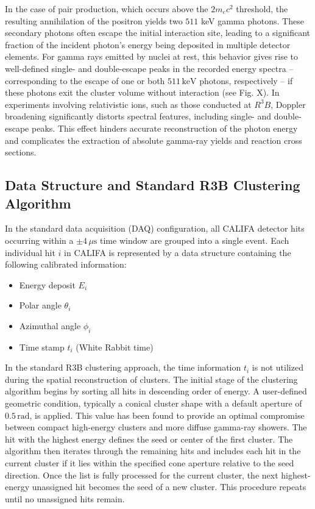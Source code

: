 \documentclass[final,5p,times,twocolumn]{elsarticle}
\begin{document}
In the case of pair production, which occurs above the $2m_ec^2$ threshold, the resulting annihilation of the positron yields two $511$ keV gamma photons. These secondary photons often escape the initial interaction site, leading to a significant fraction of the incident photon’s energy being deposited in multiple detector elements.\newline
For gamma rays emitted by nuclei at rest, this behavior gives rise to well-defined single- and double-escape peaks in the recorded energy spectra -- corresponding to the escape of one or both $511\,\mathrm{keV}$ photons, respectively -- if these photons exit the cluster volume without interaction (see Fig. X).\newline
In experiments involving relativistic ions, such as those conducted at $R^3B$, Doppler broadening significantly distorts spectral features, including single- and double-escape peaks. This effect hinders accurate reconstruction of the photon energy and complicates the extraction of absolute gamma-ray yields and reaction cross sections.

\subsection{Data Structure and Standard R3B Clustering Algorithm}\label{s_sec:r3b_clustering}
In the standard data acquisition (DAQ) configuration, all CALIFA detector hits occurring within a $\pm 4\,\mu\mathrm{s}$ time window are grouped into a single event. Each individual hit $i$ in CALIFA is represented by a data structure containing the following calibrated information:
\begin{itemize}
    \item Energy deposit $E_i$
    \item Polar angle $\theta_i$
    \item Azimuthal angle $\phi_i$
    \item Time stamp $t_i$ (White Rabbit time)
\end{itemize}
In the standard R3B clustering approach, the time information $t_i$ is not utilized during the spatial reconstruction of clusters.\newline
The initial stage of the clustering algorithm begins by sorting all hits in descending order of energy. A user-defined geometric condition, typically a conical cluster shape with a default aperture of $0.5\,\mathrm{rad}$, is applied. This value has been found to provide an optimal compromise between compact high-energy clusters and more diffuse gamma-ray showers.\newline
The hit with the highest energy defines the seed or center of the first cluster. The algorithm then iterates through the remaining hits and includes each hit in the current cluster if it lies within the specified cone aperture relative to the seed direction. Once the list is fully processed for the current cluster, the next highest-energy unassigned hit becomes the seed of a new cluster. This procedure repeats until no unassigned hits remain.\newline
\end{document}
